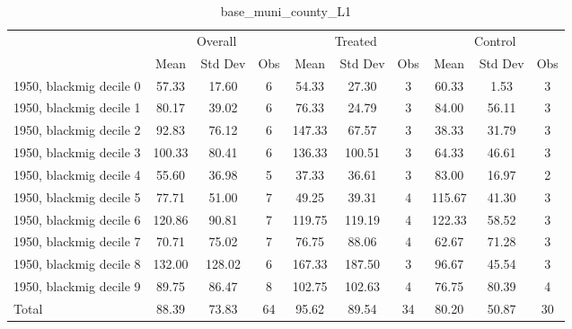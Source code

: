 \begin{table}[htbp]\centering
\def\sym#1{\ifmmode^{#1}\else\(^{#1}\)\fi}
\caption{base\_muni\_county\_L1 \label{tab1}}
\begin{tabular}{l*{3}{ccc}}
\toprule
                    &\multicolumn{3}{c}{Overall}           &\multicolumn{3}{c}{Treated}           &\multicolumn{3}{c}{Control}           \\
                    &        Mean&     Std Dev&         Obs&        Mean&     Std Dev&         Obs&        Mean&     Std Dev&         Obs\\
\midrule
1950, blackmig decile 0&       57.33&       17.60&           6&       54.33&       27.30&           3&       60.33&        1.53&           3\\
1950, blackmig decile 1&       80.17&       39.02&           6&       76.33&       24.79&           3&       84.00&       56.11&           3\\
1950, blackmig decile 2&       92.83&       76.12&           6&      147.33&       67.57&           3&       38.33&       31.79&           3\\
1950, blackmig decile 3&      100.33&       80.41&           6&      136.33&      100.51&           3&       64.33&       46.61&           3\\
1950, blackmig decile 4&       55.60&       36.98&           5&       37.33&       36.61&           3&       83.00&       16.97&           2\\
1950, blackmig decile 5&       77.71&       51.00&           7&       49.25&       39.31&           4&      115.67&       41.30&           3\\
1950, blackmig decile 6&      120.86&       90.81&           7&      119.75&      119.19&           4&      122.33&       58.52&           3\\
1950, blackmig decile 7&       70.71&       75.02&           7&       76.75&       88.06&           4&       62.67&       71.28&           3\\
1950, blackmig decile 8&      132.00&      128.02&           6&      167.33&      187.50&           3&       96.67&       45.54&           3\\
1950, blackmig decile 9&       89.75&       86.47&           8&      102.75&      102.63&           4&       76.75&       80.39&           4\\
Total               &       88.39&       73.83&          64&       95.62&       89.54&          34&       80.20&       50.87&          30\\
\bottomrule
\end{tabular}
\end{table}

